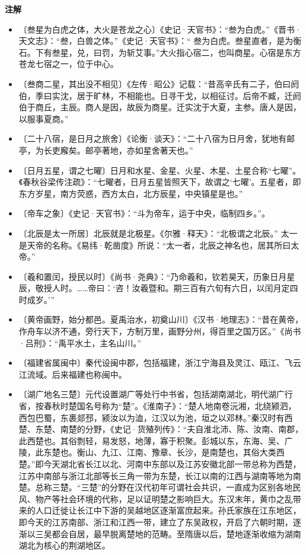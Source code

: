 \documentclass[12pt,UTF-8,openany,a4]{ctexbook}
\begin{document}
\newpage

\begin{Large}
    \noindent\textbf{注解}
\end{Large}


\vspace{-1em}

\begin{itemize}
    \setlength\itemsep{-0.2em}
    \item〔叁星为白虎之体，大火是苍龙之心〕{\yiwen 《史记·天官书》：“叁为白虎。”《晋书·天文志》：“叁，白兽之体。”《史记·天官书》：“ 叁为白虎。叁星直者，是为衡石。下有叁星，兑，曰罚，为斩艾事。”大火指心宿二，也叫商星。心宿是东方苍龙七宿之一，位于中心。}
    \item〔叁商二星，其出没不相见〕{\yiwen 《左传·昭公》记载：“昔高辛氏有二子，伯曰阏伯，季曰实沈，居于旷林，不相能也。日寻干戈，以相征讨。后帝不臧，迁阏伯于商丘，主辰。商人是因，故辰为商星。迁实沈于大夏，主参。唐人是因，以服事夏商。”}
    \item〔二十八宿，是日月之旅舍〕{\yiwen 《论衡·谈天》：“二十八宿为日月舍，犹地有邮亭，为长吏廨矣。邮亭著地，亦如星舍著天也。”}
    \item〔日月五星，谓之七曜〕{\yiwen 日月和水星、金星、火星、木星、土星合称“七曜”。《春秋谷梁传注疏》：“七曜者，日月五星皆照天下，故谓之‘七曜’。五星者，即东方岁星，南方荧惑，西方太白，北方辰星，中央镇星是也。”}
    \item〔帝车之象〕{\yiwen 《史记·天官书》：“斗为帝车，运于中央，临制四乡。”。}
    \item〔北辰是太一所居〕{\yiwen 北辰就是北极星。《尔雅·释天》：“北极谓之北辰。” 太一是天帝的名称。《易纬·乾凿度》所说：“太一者，北辰之神名也，居其所曰太帝。”}
    \item〔羲和置闰，授民以时〕{\yiwen 《尚书·尧典》：“乃命羲和，钦若昊天，历象日月星辰，敬授人时。……帝曰：‘咨！汝羲暨和。期三百有六旬有六日，以闰月定四时成岁。’”}
    \item〔黄帝画野，始分都邑。夏禹治水，初奠山川〕{\yiwen 《汉书·地理志》：“昔在黄帝，作舟车以济不通，旁行天下，方制万里，画野分州，得百里之国万区。”《尚书·吕刑》：“禹平水土，主名山川。”}
    \item〔福建省属闽中〕{\yiwen 秦代设闽中郡，包括福建，浙江宁海县及灵江、瓯江、飞云江流域。后来福建也称闽中。}
    \item〔湖广地名三楚〕{\yiwen 元代设置湖广等处行中书省，包括湖南湖北，明代湖广行省，按春秋时楚国名号称为“楚”。《淮南子》：“楚人地南卷沅湘，北绕颍泗，西包巴蜀，东裹郯邳，颍汝以为洫，江汉以为池，垣之以邓林。”秦汉时有西楚、东楚、南楚的分野，《史记·货殖列传》：“夫自淮北沛、陈、汝南、南郡，此西楚也。其俗剽轻，易发怒，地薄，寡于积聚。彭城以东，东海、吴、广陵，此东楚也。衡山、九江、江南、豫章、长沙，是南楚也，其俗大类西楚。”即今天湖北省长江以北、河南中东部以及江苏安徽北部一带总称为西楚，江苏中南部与浙江北部等长三角一带为东楚，长江以南的江西与湖南等地为南楚。总称三楚。“三楚”的分野在汉代初年可谓社会共识，一直成为区别各地民风、物产等社会环境的代称，足以证明楚之影响巨大。东汉末年，黄巾之乱带来的人口迁徙让长江中下游的吴越地区逐渐富庶起来。孙氏家族在江东地区，即今天的江苏南部、浙江和江西一带，建立了东吴政权，开启了六朝时期，逐渐以三吴都会自居，最早脱离楚地的范畴。至隋唐以后，楚地逐渐收缩为湖南湖北为核心的荆湖地区。}

\end{itemize}
\end{document}
